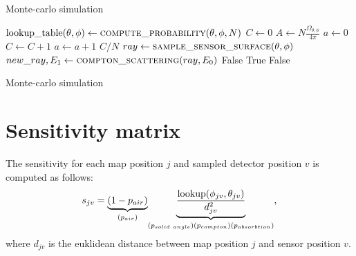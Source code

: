 \begin{algorithm}[h!]
\caption{Monte-carlo simulation}\label{alg:cap}
\begin{algorithmic}
      \State $\mathrm{lookup\_table}(\theta, \phi) \gets \Call{compute\_probability}{\theta, \phi, N}$
    \EndFor
  \EndFor
\EndFunction
\Statex
{}
\State $C \gets 0$
\State $A \gets N\frac{\Omega_{\theta, \phi}}{4 \pi}$ 
\State $a \gets 0$
   
  \State $C \gets C + 1 $ 
  \EndIf
  \State $a \gets a + 1$
\EndWhile
  \State \Return $C/N$ 
  \EndFunction
\Statex
  \State $ray \gets \Call{sample\_sensor\_surface}{\theta,\phi}$ 
   
  \State $new\_ray, E_{1} \gets \Call{compton\_scattering}{ray, E_{0}}$ 
  \Else{}
    \State \Return False 
  \EndIf
    
    \State \Return True
  \Else{}
    \State \Return False
  \EndIf
\EndFunction
\end{algorithmic}
  \label{alg:monte}
  \caption{Monte-carlo simulation}
\end{algorithm}


\section{Sensitivity matrix}
The sensitivity for each map position $j$ and sampled detector position $v$ is computed as follows:
\begin{equation}
  s_{jv} = \underset{(p_{air})}{\underbrace{(1-p_{air}) }} \underset{(p_{solid\ angle})\\(p_{compton})\\(p_{absorbtion})} {\underbrace{\frac{\mathrm{lookup}(\phi_{jv}, \theta_{jv})}{d^{2}_{jv}}}},  
\end{equation}
where $d_{jv}$ is the euklidean distance between map position $j$ and sensor position $v$. 


